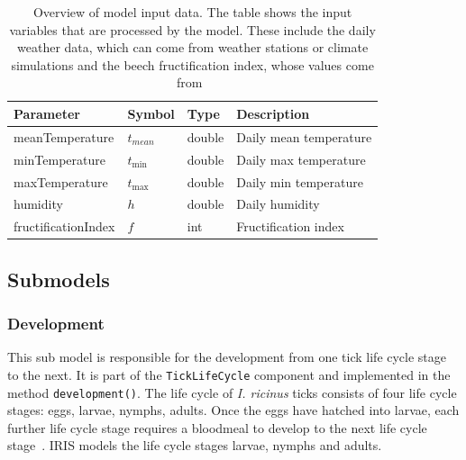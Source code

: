 \documentclass[a4paper, 11pt]{scrartcl}
\newcommand{\inlinecode}[1]{\texttt{\small #1}}
\begin{document}
\begin{table}[h!]
\caption[Overview of model input data.]{Overview of model input data. The table shows the input variables that are processed by the model. These include the daily weather data, which can come from weather stations or climate simulations and the beech fructification index, whose values come from~\textcite{Konnert.2016}}
\label{tab:input_parameters}
\begin{tabularx}{\textwidth}{llll}
\toprule
\textbf{Parameter} & \textbf{Symbol} & \textbf{Type}     & \textbf{Description}       \\
\midrule
meanTemperature    & $t_{mean}$      & double            & Daily mean temperature     \\
minTemperature     & $t_{\min}$      & double            & Daily max temperature      \\
maxTemperature     & $t_{\max}$      & double            & Daily min temperature      \\
humidity           & $h$             & double            & Daily humidity             \\
\midrule
fructificationIndex & $f$            & int               & Fructification index		  \\
\bottomrule
\end{tabularx}
\end{table}


\newpage
\subsection{Submodels}\label{submodels}

\subsubsection{Development}
This sub model is responsible for the development from one tick life cycle stage to the next. It is part of the \inlinecode{TickLifeCycle} component and implemented in the method \inlinecode{development()}. The life cycle of \textit{I. ricinus} ticks consists of four life cycle stages: eggs, larvae, nymphs, adults. Once the eggs have hatched into larvae, each further life cycle stage requires a bloodmeal to develop to the next life cycle stage~\parencite{tba}. IRIS models the life cycle stages larvae, nymphs and adults.
\end{document}
